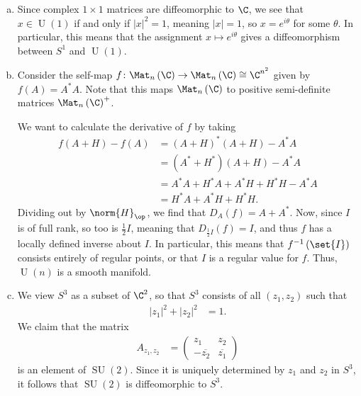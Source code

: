 \documentclass[10pt]{mypackage}
\begin{document}
\begin{solution}\hfill
  \begin{enumerate}[(a)]
    \item Since complex $1\times 1$ matrices are diffeomorphic to $\C$, we see that $x\in \operatorname{U}(1)$ if and only if $\left\vert x \right\vert^2 = 1$, meaning $\left\vert x \right\vert = 1$, so $x = e^{i\theta}$ for some $\theta$. In particular, this means that the assignment $x\mapsto e^{i\theta}$ gives a diffeomorphism between $S^{1}$ and $\operatorname{U}(1)$.
    \item Consider the self-map $f\colon \Mat_{n}\left( \C \right)\rightarrow \Mat_{n}\left( \C \right)\cong \C^{n^2}$ given by $f(A) = A^{\ast}A$. Note that this maps $\Mat_{n}\left( \C \right)$ to positive semi-definite matrices $\Mat_{n}\left( \C \right)^{+}$.\newline

      We want to calculate the derivative of $f$ by taking
      \begin{align*}
        f\left( A + H \right) - f\left( A \right) &= \left( A+H \right)^{\ast}\left( A+H \right) - A^{\ast}A\\
                                                  &= \left( A^{\ast} + H^{\ast} \right)\left( A + H \right) - A^{\ast}A\\
                                                  &= A^{\ast}A + H^{\ast}A + A^{\ast}H + H^{\ast}H - A^{\ast}A\\
                                                  &= H^{\ast}A + A^{\ast}H + H^{\ast}H.
      \end{align*}
      Dividing out by $\norm{H}_{\op}$, we find that $D_{A}(f) = A + A^{\ast}$. Now, since $I$ is of full rank, so too is $\frac{1}{2}I$, meaning that $D_{\frac{1}{2}I}(f) = I$, and thus $f$ has a locally defined inverse about $I$. In particular, this means that $f^{-1}\left( \set{I} \right)$ consists entirely of regular points, or that $I$ is a regular value for $f$. Thus, $\operatorname{U}(n)$ is a smooth manifold.
    \item We view $S^{3}$ as a subset of $\C^{2}$, so that $S^{3}$ consists of all $\left( z_1,z_2 \right)$ such that
      \begin{align*}
        \left\vert z_1 \right\vert^2 + \left\vert z_2 \right\vert^2 &= 1.
      \end{align*}
      We claim that the matrix
      \begin{align*}
        A_{z_1,z_2} &= \begin{pmatrix}z_1 & z_2 \\ - \overline{z_2} & \overline{z_1}\end{pmatrix}
      \end{align*}
      is an element of $\operatorname{SU}\left( 2 \right)$. Since it is uniquely determined by $z_1$ and $z_2$ in $S^{3}$, it follows that $\operatorname{SU}(2)$ is diffeomorphic to $S^{3}$.\newline


\end{enumerate}
\end{solution}
\end{document}
